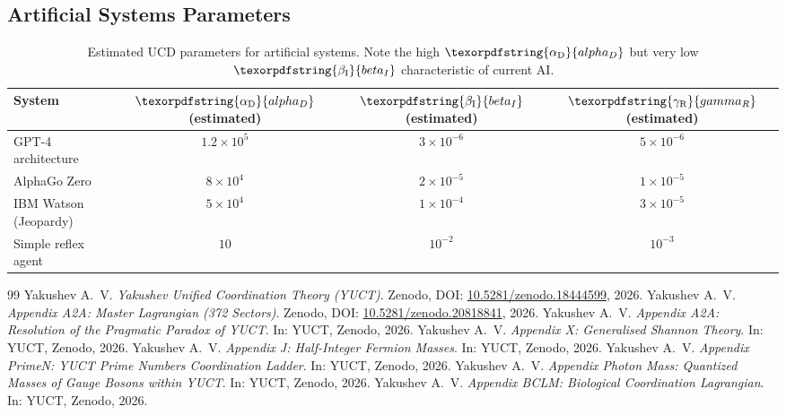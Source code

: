\documentclass[12pt,a4paper]{article}
\DeclareRobustCommand{\alD}{\texorpdfstring{\ensuremath{\alpha_{\mathrm{D}}}}{alpha_D}}
\DeclareRobustCommand{\beI}{\texorpdfstring{\ensuremath{\beta_{\mathrm{I}}}}{beta_I}}
\DeclareRobustCommand{\gaR}{\texorpdfstring{\ensuremath{\gamma_{\mathrm{R}}}}{gamma_R}}
\begin{document}
	\subsection{Artificial Systems Parameters}
	
	\begin{table}[ht]
		\centering
		\begin{tabular}{lccc}
			\toprule
			\textbf{System} & \(\alD\) (estimated) & \(\beI\) (estimated) & \(\gaR\) (estimated) \\
			\midrule
			GPT-4 architecture & \(1.2 \times 10^5\) & \(3 \times 10^{-6}\) & \(5 \times 10^{-6}\) \\
			AlphaGo Zero & \(8 \times 10^4\) & \(2 \times 10^{-5}\) & \(1 \times 10^{-5}\) \\
			IBM Watson (Jeopardy) & \(5 \times 10^4\) & \(1 \times 10^{-4}\) & \(3 \times 10^{-5}\) \\
			Simple reflex agent & \(10\) & \(10^{-2}\) & \(10^{-3}\) \\
			\bottomrule
		\end{tabular}
		\caption{Estimated UCD parameters for artificial systems. Note the high \(\alD\) but very low \(\beI\) characteristic of current AI.}
		\label{tab:ai-measurements}
	\end{table}
	
	\begin{thebibliography}{99}
		Yakushev A.~V. \emph{Yakushev Unified Coordination Theory (YUCT)}. Zenodo, DOI: \href{https://doi.org/10.5281/zenodo.18444599}{10.5281/zenodo.18444599}, 2026.
		Yakushev A.~V. \emph{Appendix A2A: Master Lagrangian (372 Sectors)}. Zenodo, DOI: \href{https://doi.org/10.5281/zenodo.20818841}{10.5281/zenodo.20818841}, 2026.
		Yakushev A.~V. \emph{Appendix A2A: Resolution of the Pragmatic Paradox of YUCT}. In: YUCT, Zenodo, 2026.
		Yakushev A.~V. \emph{Appendix X: Generalised Shannon Theory}. In: YUCT, Zenodo, 2026.
		Yakushev A.~V. \emph{Appendix J: Half-Integer Fermion Masses}. In: YUCT, Zenodo, 2026.
		Yakushev A.~V. \emph{Appendix PrimeN: YUCT Prime Numbers Coordination Ladder}. In: YUCT, Zenodo, 2026.
		Yakushev A.~V. \emph{Appendix Photon Mass: Quantized Masses of Gauge Bosons within YUCT}. In: YUCT, Zenodo, 2026.
		Yakushev A.~V. \emph{Appendix BCLM: Biological Coordination Lagrangian}. In: YUCT, Zenodo, 2026.
	\end{thebibliography}
	
\end{document}
